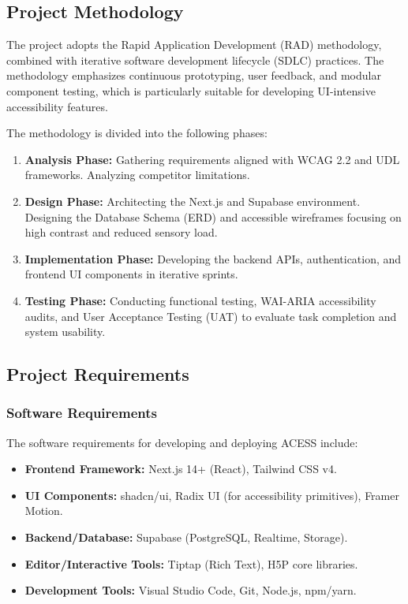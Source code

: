 \documentclass[12pt,a4paper]{report}
\begin{document}
\subsection{Project Methodology}
The project adopts the Rapid Application Development (RAD) methodology, combined with iterative software development lifecycle (SDLC) practices. The methodology emphasizes continuous prototyping, user feedback, and modular component testing, which is particularly suitable for developing UI-intensive accessibility features.

The methodology is divided into the following phases:
\begin{enumerate}
\item \textbf{Analysis Phase:} Gathering requirements aligned with WCAG 2.2 and UDL frameworks. Analyzing competitor limitations.
\item \textbf{Design Phase:} Architecting the Next.js and Supabase environment. Designing the Database Schema (ERD) and accessible wireframes focusing on high contrast and reduced sensory load.
\item \textbf{Implementation Phase:} Developing the backend APIs, authentication, and frontend UI components in iterative sprints.
\item \textbf{Testing Phase:} Conducting functional testing, WAI-ARIA accessibility audits, and User Acceptance Testing (UAT) to evaluate task completion and system usability.
\end{enumerate}

\subsection{Project Requirements}

\subsubsection{Software Requirements}
The software requirements for developing and deploying ACESS include:
\begin{itemize}[itemsep=-1mm]
\item \textbf{Frontend Framework:} Next.js 14+ (React), Tailwind CSS v4.
\item \textbf{UI Components:} shadcn/ui, Radix UI (for accessibility primitives), Framer Motion.
\item \textbf{Backend/Database:} Supabase (PostgreSQL, Realtime, Storage).
\item \textbf{Editor/Interactive Tools:} Tiptap (Rich Text), H5P core libraries.
\item \textbf{Development Tools:} Visual Studio Code, Git, Node.js, npm/yarn.
\end{itemize}
\end{document}

